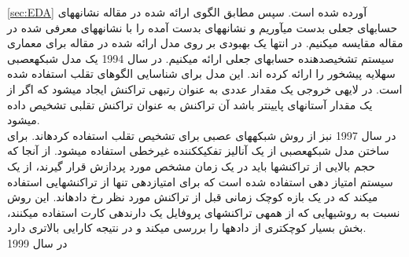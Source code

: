 \documentclass[journal]{IEEEtran}
\newcommand{\نیمفاصله}{\halfspace}
\renewcommand{\ }{\halfspace}
\newcommand{\وکا}{\lr{WEKA} }
\newcommand{\ار}{\lr{R} }
\renewcommand{\|}[1][.3em]{\hspace{#1}|\hspace{#1}}
\renewcommand{\,}[1][.3em]{,\hspace{#1}}
\begin{document}
\ref{sec:EDA}
 آورده شده است. سپس مطابق الگوی ارائه شده در مقاله نشانه\ های حساب\ های جعلی بدست می\ آوریم و نشانه\ های بدست آمده را با نشانه\ های معرفی شده در مقاله مقایسه می\ کنیم. در انتها یک بهبودی بر روی مدل ارائه شده در مقاله برای معماری سیستم تشخیص\ دهنده حساب\ های جعلی ارائه می\ کنیم.
\قسمت{پیشینه\ ی تحقیق}
در سال 1994\
\cite{RELWORKS:P1994}
یک مدل شبکه\ عصبی سه\ لایه پیش\ خور را ارائه کرده اند. این مدل برای شناسایی الگوهای تقلب استفاده شده است. در لایه\ ی خروجی یک مقدار عددی به عنوان رتبه\ ی تراکنش ایجاد می\ شود که اگر از یک مقدار آستانه\ ای پایین\ تر باشد آن تراکنش به عنوان تراکنش تقلبی تشخیص داده می\ شود.
\\
در سال 1997\
\cite{RELWORKS:P1997}
نبز از روش شبکه\ های عصبی برای تشخیص تقلب استفاده کرده\ اند. برای ساختن مدل شبکه\ عصبی از یک آنالیز تفکیک\ کننده غیرخطی استفاده می\ شود. از آنجا که حجم بالایی از تراکنش\ ها باید در یک زمان مشخص مورد پردازش قرار گیرند، از یک سیستم امتیاز دهی استفاده شده است که برای امتیازدهی تنها از تراکنش\ هایی استفاده می\ کند که در یک بازه کوچک زمانی قبل از تراکنش مورد نظر رخ داده\ اند. این روش نسبت به روشی\ هایی که از همه\ ی تراکنش\ های پروفایل یک دارنده\ ی کارت استفاده می\ کنند، بخش بسیار کوچکتری از داده\ ها را بررسی می\ کند و در نتیجه کارایی بالاتری دارد.
\\
\lr{Chan et al.}
در سال 1999\
\cite{RELWORKS:P1999}
\end{document}
